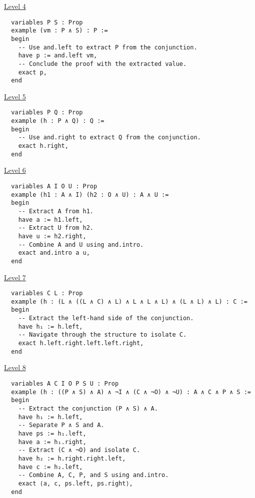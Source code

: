 \documentclass{article}
\theoremstyle{theorem}
\theoremstyle{definition}
\theoremstyle{remark}
\begin{document}
\medskip\noindent\centerline{\underline{Level 4}}

\begin{verbatim}
  variables P S : Prop
  example (vm : P ∧ S) : P :=
  begin
    -- Use and.left to extract P from the conjunction.
    have p := and.left vm,
    -- Conclude the proof with the extracted value.
    exact p,
  end
\end{verbatim}

\medskip\noindent\centerline{\underline{Level 5}}

\begin{verbatim}
  variables P Q : Prop
  example (h : P ∧ Q) : Q :=
  begin
    -- Use and.right to extract Q from the conjunction.
    exact h.right,
  end
\end{verbatim}

\medskip\noindent\centerline{\underline{Level 6}}

\begin{verbatim}
  variables A I O U : Prop
  example (h1 : A ∧ I) (h2 : O ∧ U) : A ∧ U :=
  begin
    -- Extract A from h1.
    have a := h1.left,
    -- Extract U from h2.
    have u := h2.right,
    -- Combine A and U using and.intro.
    exact and.intro a u,
  end
\end{verbatim}

\medskip\noindent\centerline{\underline{Level 7}}

\begin{verbatim}
  variables C L : Prop
  example (h : (L ∧ ((L ∧ C) ∧ L) ∧ L ∧ L ∧ L) ∧ (L ∧ L) ∧ L) : C :=
  begin
    -- Extract the left-hand side of the conjunction.
    have h₁ := h.left,
    -- Navigate through the structure to isolate C.
    exact h.left.right.left.left.right,
  end
\end{verbatim}

\medskip\noindent\centerline{\underline{Level 8}}

\begin{verbatim}
  variables A C I O P S U : Prop
  example (h : ((P ∧ S) ∧ A) ∧ ¬I ∧ (C ∧ ¬O) ∧ ¬U) : A ∧ C ∧ P ∧ S :=
  begin
    -- Extract the conjunction (P ∧ S) ∧ A.
    have h₁ := h.left,
    -- Separate P ∧ S and A.
    have ps := h₁.left,
    have a := h₁.right,
    -- Extract (C ∧ ¬O) and isolate C.
    have h₂ := h.right.right.left,
    have c := h₂.left,
    -- Combine A, C, P, and S using and.intro.
    exact ⟨a, c, ps.left, ps.right⟩,
  end
\end{verbatim}
\end{document}
